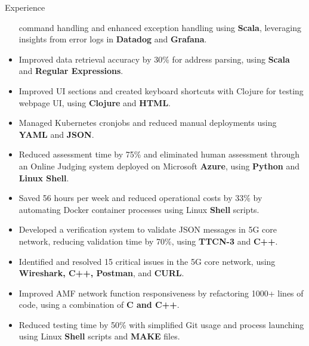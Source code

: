 \documentclass{resume} %
\begin{document}
\begin{workSection}{Experience}
\begin{itemize}
              command
              handling and enhanced exception handling using \textbf{Scala},
              leveraging
              insights from
              error logs in \textbf{Datadog} and \textbf{Grafana}.
        \item Improved data retrieval accuracy by 30\% for address parsing,
              using \textbf{Scala} and \textbf{Regular
                  Expressions}.
        \item Improved UI sections and created keyboard shortcuts with Clojure
              for testing webpage UI, using \textbf{Clojure} and \textbf{HTML}.
        \item Managed Kubernetes cronjobs and reduced manual deployments using
              \textbf{YAML} and \textbf{JSON}.
    \end{itemize}

    \experienceItem[
    company=CodePro Education \& Universities,
    location=Taichung{,} Taiwan,
    position=Software Engineer,
    duration=Dec 2019 – Dec 2020
    ]
    \vspace{-0.65em}
    \begin{itemize}
        \itemsep -6pt {}
        \item Reduced assessment time by 75\% and eliminated human assessment
              through an Online Judging system deployed on Microsoft \textbf{Azure},
              using \textbf{Python} and
              \textbf{Linux Shell}.
        \item Saved 56 hours per week and reduced operational costs by 33\% by
              automating Docker container processes using Linux \textbf{Shell} scripts.
    \end{itemize}

    \experienceItem[
    company=Free5gc department of NCTU,
    location=Hsinchu{,} Taiwan,
    position=Backend Engineer,
    duration=Jul 2019 – Nov 2019
    ]
    \vspace{-0.65em}
    \begin{itemize}
        \itemsep -6pt {}
        \item Developed a verification system to validate JSON messages
              in 5G core network, reducing validation time by
              70\%, using \textbf{TTCN-3} and \textbf{C++}.
        \item Identified and resolved 15 critical issues in the 5G core
              network, using \textbf{Wireshark, C++, Postman}, and \textbf{CURL}.
        \item Improved AMF network function responsiveness by refactoring 1000+
              lines of code, using a combination of \textbf{C and C++}.
        \item Reduced testing time by 50\% with simplified Git usage and
              process launching using Linux \textbf{Shell} scripts and \textbf{MAKE} files.
    \end{itemize}


\end{workSection}
\end{document}
